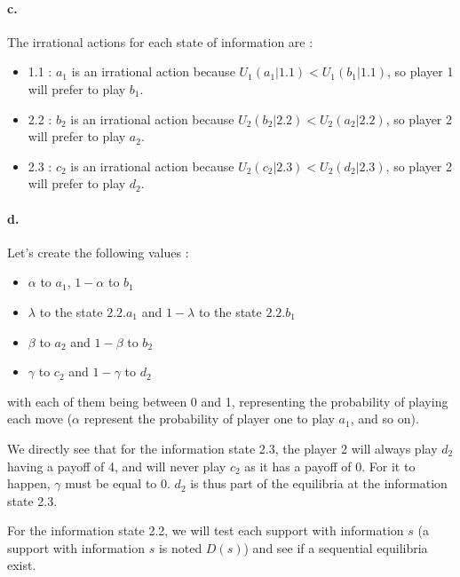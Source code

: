 \paragraph{c.}\label{parac} The irrational actions for each state of information are :

\begin{itemize}
\item 1.1 : $a_1$ is an irrational action because $U_1(a_1|1.1) < U_1(b_1|1.1)$, so player 1 will prefer to play $b_1$.
\item 2.2 : $b_2$ is an irrational action because $U_2(b_2|2.2) < U_2(a_2|2.2)$, so player 2 will prefer to play $a_2$.
\item 2.3 : $c_2$ is an irrational action because $U_2(c_2|2.3) < U_2(d_2|2.3)$, so player 2 will prefer to play $d_2$.
\end{itemize}

\paragraph{d.} Let's create the following values :

\begin{itemize}
    \item $\alpha$ to $a_1$, $1-\alpha$ to $b_1$
    \item $\lambda$ to the state $2.2.a_1$ and $1-\lambda$ to the state $2.2.b_1$
    \item $\beta$ to $a_2$ and $1-\beta$ to $b_2$
    \item $\gamma$ to $c_2$ and $1-\gamma$ to $d_2$
\end{itemize} 
with each of them being between 0 and 1, representing the probability of playing each move ($\alpha$ represent the probability of player one to play $a_1$, and so on).

We directly see that for the information state 2.3, the player 2 will always play $d_2$ having a payoff of 4, and will never play $c_2$ as it has a payoff of 0. For it to happen, $\gamma$ must be equal to 0. $d_2$ is thus part of the equilibria at the information state 2.3. 

For the information state 2.2, we will test each support with information $s$ (a support with information $s$ is noted $D(s)$) and see if a sequential equilibria exist. 

